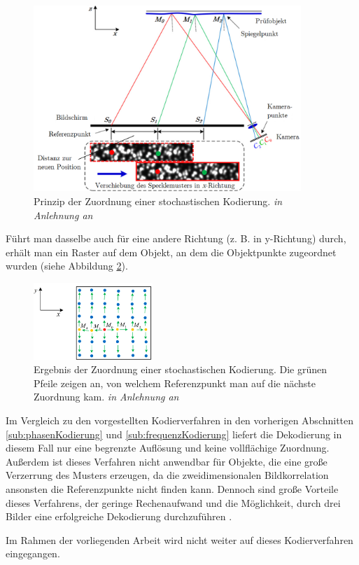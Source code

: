 \begin{figure}[H]
	\centering
	\includegraphics[width=0.9\textwidth]{02_grundlagenDerDeflektometrie/rekonstruktion/stochastischeKodierung/figures/Prinzip}
	\caption[Prinzip der Zuordnung einer stochastischen Kodierung]{Prinzip der Zuordnung einer stochastischen Kodierung. \textit{in Anlehnung an} \cite{specklePattern}}
	\label{img:prinzipStoKodierung}
\end{figure}
%
\noindent
Führt man dasselbe auch für eine andere Richtung (z. B. in y-Richtung) durch, erhält man ein Raster auf dem Objekt, an dem die Objektpunkte zugeordnet wurden (siehe Abbildung \ref{img:ergebnisStoKodierung}).
%
\begin{figure}[H]
	\centering
	\includegraphics[width=0.4\textwidth]{02_grundlagenDerDeflektometrie/rekonstruktion/stochastischeKodierung/figures/Ergebnis}
	\caption[Ergebnis der Zuordnung einer stochastischen Kodierung]{Ergebnis der Zuordnung einer stochastischen Kodierung. Die grünen Pfeile zeigen an, von welchem Referenzpunkt man auf die nächste Zuordnung kam. \textit{in Anlehnung an} \cite{specklePattern}}
	\label{img:ergebnisStoKodierung}
\end{figure}
%
\noindent
Im Vergleich zu den vorgestellten Kodierverfahren in den vorherigen Abschnitten \ref{sub:phasenKodierung} und \ref{sub:frequenzKodierung} liefert die Dekodierung in diesem Fall nur eine begrenzte Auflösung und keine vollflächige Zuordnung.
Außerdem ist dieses Verfahren nicht anwendbar für Objekte, die eine große Verzerrung des Musters erzeugen, da die zweidimensionalen Bildkorrelation ansonsten die Referenzpunkte nicht finden kann.
Dennoch sind große Vorteile dieses Verfahrens, der geringe Rechenaufwand und die Möglichkeit, durch drei Bilder eine erfolgreiche Dekodierung durchzuführen \cite{specklePattern}.

\p
Im Rahmen der vorliegenden Arbeit wird nicht weiter auf dieses Kodierverfahren eingegangen.
